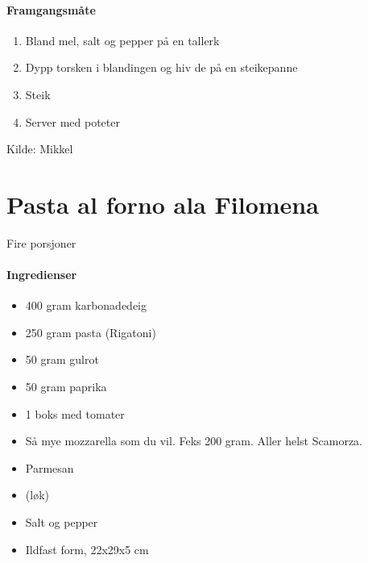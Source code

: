 \documentclass[12pt,a4paper]{book}
\begin{document}
\paragraph{Framgangsmåte}
\begin{enumerate}[noitemsep]
	\item Bland mel, salt og pepper på en tallerk
	\item Dypp torsken i blandingen og hiv de på en steikepanne
	\item Steik
	\item Server med poteter
\end{enumerate}


Kilde: Mikkel
\clearpage{}
\clearpage{}\section{﻿Pasta al forno ala Filomena}

Fire porsjoner

\paragraph{Ingredienser}
\begin{itemize}[noitemsep]
	\item 400 gram karbonadedeig
	\item 250 gram pasta (Rigatoni)
	\item 50 gram gulrot
	\item 50 gram paprika
	\item 1 boks med tomater
	\item Så mye mozzarella som du vil. Feks 200 gram. Aller helst Scamorza.
	\item Parmesan
	\item (løk)
	\item Salt og pepper
	\item Ildfast form, 22x29x5 cm
\end{itemize}
\end{document}
